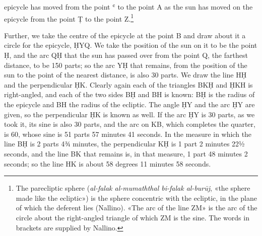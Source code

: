 \documentclass[11pt]{article}
\newcommand{\ArPage}[1]{\marginpar{\footnotesize\color{gray}Ar.\,p.\,#1}}
\begin{document}
epicycle has moved from the point ʿ to the point A as the sun has moved on the epicycle from the point Ṭ to the point Z.\footnote{The parecliptic sphere (\emph{al-falak al-mumaththal bi-falak al-burūj}, «the sphere made like the ecliptic») is the sphere concentric with the ecliptic, in the plane of which the deferent lies (Nallino). «The arc of the line ZM» is the arc of the circle about the right-angled triangle of which ZM is the sine. The words in brackets are supplied by Nallino.}\par
\par \ArPage{70}Further, we take the centre of the epicycle at the point B and draw about it a circle for the epicycle, ḤYQ. We take the position of the sun on it to be the point Ḥ, and the arc QḤ that the sun has passed over from the point Q, the farthest distance, to be 150 parts; so the arc YḤ that remains, from the position of the sun to the point of the nearest distance, is also 30 parts. We draw the line HḤ and the perpendicular ḤK. Clearly again each of the triangles BKḤ and ḤKH is right-angled, and each of the two sides BḤ and BH is known: BḤ is the radius of the epicycle and BH the radius of the ecliptic. The angle ḤY and the arc ḤY are given, so the perpendicular ḤK is known as well. If the arc ḤY is 30 parts, as we took it, its sine is also 30 parts, and the arc on KB, which completes the quarter, is 60, whose sine is 51 parts 57 minutes 41 seconds. In the measure in which the line BḤ is 2 parts 4¾ minutes, the perpendicular KḤ is 1 part 2 minutes 22½ seconds, and the line BK that remains is, in that measure, 1 part 48 minutes 2 seconds; so the line HK is about 58 degrees 11 minutes 58 seconds.\par
\end{document}
